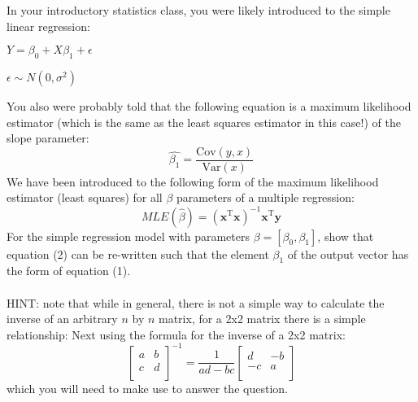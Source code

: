 \documentclass[letterpaper, 11pt]{article}
\begin{document}
In your introductory statistics class, you were likely introduced to the simple linear regression:
\begin{center}
$Y = \beta_{0} + X\beta_1 + \epsilon$
\end{center}
\begin{center}
$\epsilon \sim N(0, \sigma^2)$
\end{center}
You also were probably told that the following equation is a maximum likelihood estimator (which is the same as the least squares estimator in this case!) of the slope parameter:
\begin{equation}
\hat{\beta_1} = \frac{\mathrm{Cov}(y,x)}{\mathrm{Var}(x)}
\end{equation}
We have been introduced to the following form of the maximum likelihood estimator (least squares) for all $\beta$ parameters of a multiple regression: 
\begin{equation}
MLE(\hat{\beta}) = (\mathbf{x}^{\textrm{T}}\mathbf{x})^{-1} \mathbf{x}^{\mathrm{T}} \mathbf{y}
\end{equation}
For the simple regression model with parameters $\beta = [\beta_0, \beta_1]$, show that equation (2) can be re-written such that the element $\beta_1$ of the output vector has the form of equation (1).
\\
\\
HINT: note that while in general, there is not a simple way to calculate the inverse of an arbitrary $n$ by $n$ matrix, for a 2x2 matrix there is a simple relationship:
Next using the formula for the inverse of a 2x2 matrix:
\[
 \begin{bmatrix}
    a & b  \\
    c & d \\
  \end{bmatrix} ^ {-1}
  =
  \frac{1}{ad - bc}
  \begin{bmatrix}
    d & -b \\
    -c & a \\
  \end{bmatrix}
\]
which you will need to make use to answer the question.\\
\end{document}
